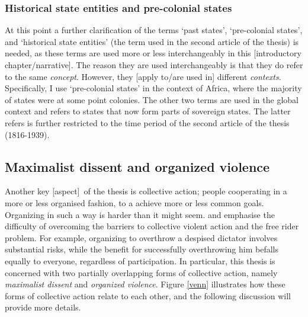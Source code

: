 \subsubsection{Historical state entities and pre-colonial states} 
\label{Historical state entities and Pre-colonial states}

At this point a further clarification of the terms `past states',
`pre-colonial states', and `historical state entities' (the term used in the
second article of the thesis) is needed, as these terms are used more or less
interchangeably in this [introductory chapter/narrative]. The reason they are
used interchangeably is that they do refer to the same \textit{concept}.
However, they [apply to/are used in] different \textit{contexts}. Specifically,
I use `pre-colonial states' in the context of Africa, where the majority of
states were at some point colonies. The other two terms are used in the global
context and refers to states that now form parts of sovereign states. The latter
refers is further restricted to the time period of the second article of the
thesis (1816-1939).

\subsection{Maximalist dissent and organized violence}
\label{Maximalist dissent and organized violence}


Another key [aspect] of the thesis is collective action; people cooperating in a
more or less organised fashion, to a achieve more or less common goals.
Organizing in such a way is harder than it might seem.
\citet{OlsonMancur1965TLoC} and \citet{Tullock_1971} emphasise the difficulty of
overcoming the barriers to collective violent action and the free rider problem.
For example, organizing to overthrow a despised dictator involves substantial
risks, while the benefit for successfully overthrowing him befalls equally to
everyone, regardless of participation. In particular, this thesis is concerned
with two partially overlapping forms of collective action, namely
\textit{maximalist dissent} and \textit{organized violence}. Figure \ref{venn}
illustrates how these forms of collective action relate to each other, and the
following discussion will provide more details.

